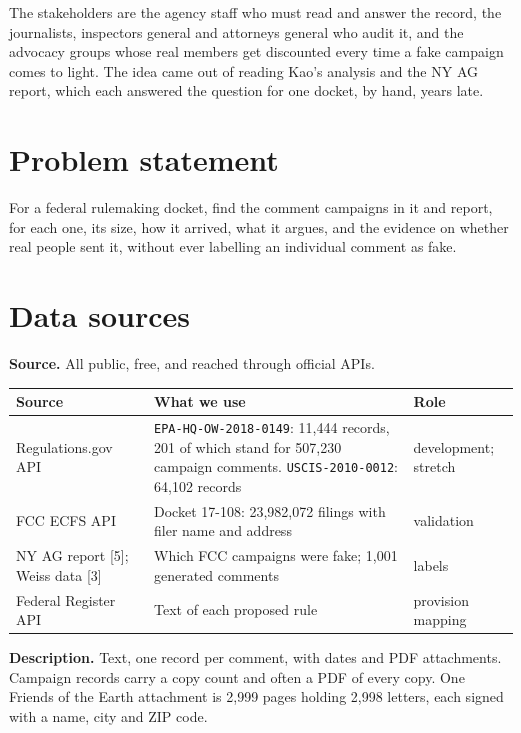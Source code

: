 \documentclass[11pt]{article}
\newcommand{\dev}{\texttt{EPA-HQ-OW-2018-0149}}
\begin{document}
The stakeholders are the agency staff who must read and answer the record, the journalists,
inspectors general and attorneys general who audit it, and the advocacy groups whose real members
get discounted every time a fake campaign comes to light. The idea came out of reading Kao's
analysis and the NY AG report, which each answered the question for one docket, by hand, years late.

\section{Problem statement}

For a federal rulemaking docket, find the comment campaigns in it and report, for each one, its size,
how it arrived, what it argues, and the evidence on whether real people sent it, without ever
labelling an individual comment as fake.

\section{Data sources}

\textbf{Source.} All public, free, and reached through official APIs.

\begin{center}
\small
\renewcommand{\arraystretch}{1.2}
\begin{tabular}{@{}L{0.25\textwidth}L{0.47\textwidth}L{0.19\textwidth}@{}}
\toprule
\textbf{Source} & \textbf{What we use} & \textbf{Role} \\
\midrule
Regulations.gov API & \dev{}: 11{,}444 records, 201 of which stand for 507{,}230 campaign
comments. \texttt{USCIS-2010-0012}: 64{,}102 records & development; stretch \\
\addlinespace[2pt]
FCC ECFS API & Docket 17-108: 23{,}982{,}072 filings with filer name and address & validation \\
\addlinespace[2pt]
NY AG report [5]; Weiss data [3] & Which FCC campaigns were fake; 1{,}001 generated comments &
labels \\
\addlinespace[2pt]
Federal Register API & Text of each proposed rule & provision mapping \\
\bottomrule
\end{tabular}
\end{center}

\textbf{Description.} Text, one record per comment, with dates and PDF attachments. Campaign
records carry a copy count and often a PDF of every copy. One
Friends of the Earth attachment is 2{,}999 pages holding 2{,}998 letters, each signed with a name,
city and ZIP code.
\end{document}
